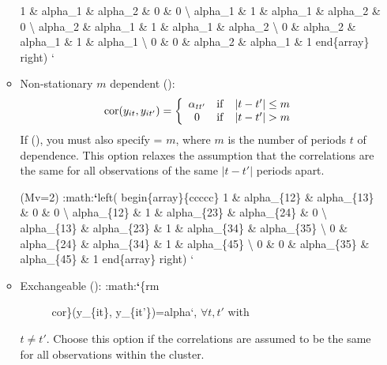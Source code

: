 \documentclass[letterpaper,10pt,english]{sphinxmanual}
\begin{document}
\begin{itemize}
\begin{itemize}
1 \& alpha\_1 \& alpha\_2 \& 0 \& 0 \textbackslash{}
alpha\_1 \& 1 \& alpha\_1 \& alpha\_2 \& 0 \textbackslash{}
alpha\_2 \& alpha\_1 \& 1 \& alpha\_1 \& alpha\_2 \textbackslash{}
0 \& alpha\_2 \& alpha\_1 \& 1 \& alpha\_1 \textbackslash{}
0 \& 0 \& alpha\_2 \& alpha\_1 \& 1
end\{array\} right) {}`

\item {} 
Non-stationary \(m\) dependent ():
\begin{gather}
\begin{split}{\rm cor}(y_{it}, y_{it'})=\left\{\begin{array}{ccc}
      \alpha_{tt'} & {\rm if} & |t-t'|\le m \\ 0 & {\rm if}
      & |t-t'| > m
    \end{array}\right.\end{split}\notag
\end{gather}
If (), you must also specify  =
\(m\), where \(m\) is the number of periods \(t\) of
dependence. This option relaxes the assumption that the
correlations are the same for all observations of the same
\(|t-t'|\) periods apart.


(Mv=2)
\textbar{} :math:{\color{red}\bfseries{}{}`}left( begin\{array\}\{ccccc\}
1 \& alpha\_\{12\} \& alpha\_\{13\} \& 0 \& 0 \textbackslash{}
alpha\_\{12\} \& 1 \& alpha\_\{23\} \& alpha\_\{24\} \& 0 \textbackslash{}
alpha\_\{13\} \& alpha\_\{23\} \& 1 \& alpha\_\{34\} \& alpha\_\{35\} \textbackslash{}
0 \& alpha\_\{24\} \& alpha\_\{34\} \& 1 \& alpha\_\{45\} \textbackslash{}
0 \& 0 \& alpha\_\{35\} \& alpha\_\{45\} \& 1
end\{array\} right) {}`

\item {} \begin{description}
\item[{Exchangeable (): :math:{\color{red}\bfseries{}{}`}\{rm}] \leavevmode
cor\}(y\_\{it\}, y\_\{it'\})=alpha{}`, \(\forall t, t'\) with

\end{description}

\(t\ne t'\). Choose this option if the correlations are
assumed to be the same for all observations within the cluster.


\end{itemize}
\end{itemize}
\end{document}
